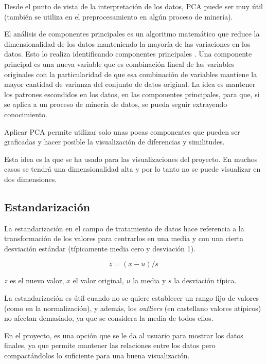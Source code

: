 Desde el punto de vista de la interpretación de los datos, PCA puede ser muy
útil (también se utiliza en el preprocesamiento en algún proceso de minería).

El análisis de componentes principales es un algoritmo matemático que reduce la
dimensionalidad de los datos manteniendo la mayoría de las variaciones en los
datos. Esto lo realiza identificando componentes principales
\cite{ringner2008principal}. Una componente principal es una nueva variable que
es combinación lineal de las variables originales con la particularidad de que
esa combinación de variables mantiene la mayor cantidad de varianza del conjunto
de datos original. La idea es mantener los patrones escondidos en los datos, en
las componentes principales, para que, si se aplica a un proceso de minería de
datos, se pueda seguir extrayendo conocimiento.

Aplicar PCA permite utilizar solo unas pocas componentes que pueden ser
graficadas y hacer posible la visualización de diferencias y similitudes.

Esta idea es la que se ha usado para las visualizaciones del proyecto. En muchos
casos se tendrá una dimensionalidad alta y por lo tanto no se puede visualizar
en dos dimensiones.

\subsection{Estandarización}

La estandarización en el campo de tratamiento de datos hace referencia a la
transformación de los valores para centrarlos en una media y con una cierta
desviación estándar (típicamente media cero y desviación 1).

\begin{equation}
  z = (x - u) / s
\end{equation}

\noindent $z$ es el nuevo valor, $x$ el valor original, $u$ la media y $s$ la
desviación típica.

La estandarización es útil cuando no se quiere establecer un rango fijo  de
valores (como en la normalización), y además, los \textit{outliers} (en
castellano valores atípicos) no afectan demasiado, ya que se considera la media
de todos ellos.

En el proyecto, es una opción que se le da al usuario para mostrar los datos
finales, ya que permite mantener las relaciones entre los datos pero
compactándolos lo suficiente para una buena visualización.

